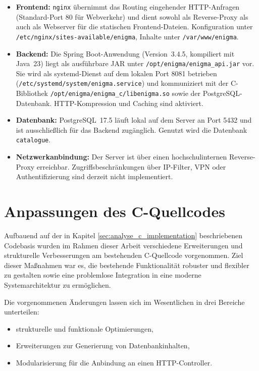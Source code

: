 \documentclass[12pt, ngerman, a4paper, numbers=noenddot]{article}
\begin{document}
\begin{itemize}
	\item \textbf{Frontend:} \lstinline|nginx| übernimmt das Routing eingehender HTTP-Anfragen (Stan\-dard-Port 80 für Webverkehr) und dient sowohl als Reverse-Proxy als auch als Webserver für die statischen Frontend-Dateien. Konfiguration unter \lstinline|/etc/nginx/sites-available/enigma|, Inhalte unter \lstinline|/var/www/enigma|.	
	
	\item \textbf{Backend:} Die Spring Boot-Anwendung (Version~3.4.5, kompiliert mit Java~23) liegt als ausführbare JAR unter \lstinline|/opt/enigma/enigma_api.jar| vor. Sie wird als systemd-Dienst auf dem lokalen Port 8081 betrieben (\lstinline|/etc/systemd/system/enigma.service|) und kommuniziert mit der C-Bibliothek \lstinline|/opt/enigma/enigma_c/libenigma.so| sowie der PostgreSQL-Datenbank. \newline HTTP-Kompression und Caching sind aktiviert.
	
	\item \textbf{Datenbank:} PostgreSQL~17.5 läuft lokal auf dem Server an Port 5432 und ist ausschließlich für das Backend zugänglich. Genutzt wird die Datenbank \lstinline|catalogue|.
	
	\item \textbf{Netzwerkanbindung:} Der Server ist über einen hochschulinternen Reverse-Proxy erreichbar. Zugriffsbeschränkungen über IP-Filter, VPN oder Authentifizierung sind derzeit nicht implementiert.
\end{itemize}


\newpage
\section{Anpassungen des C-Quellcodes}
\label{sec:c_modifications}

Aufbauend auf der in Kapitel \ref{sec:analyse_c_implementation} beschriebenen Codebasis wurden im Rahmen dieser Arbeit verschiedene Erweiterungen und strukturelle Verbesserungen am bestehenden C-Quellcode vorgenommen. Ziel dieser Maßnahmen war es, die bestehende Funktionalität robuster und flexibler zu gestalten sowie eine problemlose Integration in eine moderne Systemarchitektur zu ermöglichen.

Die vorgenommenen Änderungen lassen sich im Wesentlichen in drei Bereiche unterteilen:
\begin{itemize}
	\item strukturelle und funktionale Optimierungen,
	\item Erweiterungen zur Generierung von Datenbankinhalten,
	\item Modularisierung für die Anbindung an einen HTTP-Controller.
\end{itemize}
\end{document}
